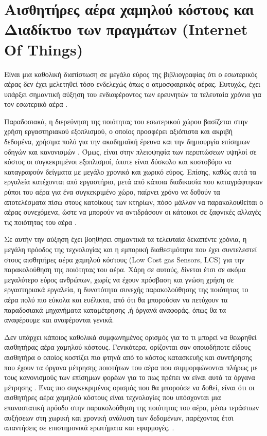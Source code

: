 \section{Αισθητήρες αέρα χαμηλού κόστους και Διαδίκτυο των πραγμάτων (Internet Of Things)}


Είναι μια καθολική διαπίστωση σε μεγάλο εύρος της βιβλιογραφίας ότι ο εσωτερικός αέρας δεν έχει μελετηθεί τόσο ενδελεχώς όπως ο ατμοσφαιρικός αέρας. 
Ευτυχώς, έχει υπάρξει σημαντική αύξηση του ενδιαφέροντος των ερευνητών τα τελευταία χρόνια για τον εσωτερικό αέρα \cite{SA2022102551}.


Παραδοσιακά, η διερεύνηση της ποιότητας του εσωτερικού χώρου βασίζεται στην χρήση εργαστηριακού εξοπλισμού,
ο οποίος προσφέρει αξιόπιστα και ακριβή δεδομένα, χρήσιμα πολύ για την ακαδημαϊκή έρευνα και την δημιουργία επίσημων οδηγών και κανονισμών \cite{EUROPEANSTANDARDS2014}. 
Όμως, είναι στην πλειοψηφία των περιπτώσεων υψηλοί σε κόστος οι συγκεκριμένοι εξοπλισμοί, όποτε είναι δύσκολο και κοστοβόρο να καταγραφούν δείγματα με μεγάλο χρονικό και χωρικό εύρος.
Επίσης, καθώς αυτά τα εργαλεία κατέχονται από εργαστήριο, μετά από κάποια διαδικασία που καταγράφτηκαν ρύποι του αέρα για ένα συγκεκριμένο χώρο, 
παίρνει χρόνο να δοθούν τα αποτελέσματα πίσω στους κατοίκους των κτηρίων,
πόσο μάλλον να παρακολουθείται ο αέρας συνεχόμενα, ώστε να μπορούν να αντιδράσουν οι κάτοικοι σε ξαφνικές αλλαγές τις ποιότητας του αέρα \cite{DAI2023164858}.

Σε αυτήν την αύξηση έχει βοηθήσει σημαντικά τα τελευταία δεκαπέντε χρόνια, η μεγάλη πρόοδος της τεχνολογίας και η εμπορική διαθεσιμότητα  που έχει συντελεστεί στους αισθητήρες αέρα χαμηλού κόστους (Low Cost gas Sensors, LCS) για την παρακολούθηση της ποιότητας του αέρα.
Χάρη σε αυτούς, δίνεται έτσι σε ακόμα μεγαλύτερο εύρος ανθρώπων, χωρίς να έχουν πρόσβαση και γνώση χρήση σε εργαστηριακά εργαλεία,
η δυνατότητα συνεχής παρακολούθησης της ποιότητας το αέρα πολύ πιο εύκολα και ευέλικτα, από ότι θα μπορούσαν να πετύχουν τα παραδοσιακά μηχανήματα καταμέτρησης \cite{CHOJER2020138385},ή όργανά αναφοράς, όπως θα τα αναφέρουμε και αναφέρονται γενικά.




Δεν υπάρχει κάποιος καθολικά συμφωνημένος ορισμός για το τι μπορεί να θεωρηθεί αισθητήρας αέρα χαμηλού κόστους.
Γενικότερα, ορίζονται σαν οποιοδήποτε είδους αισθητήρα ο οποίος κοστίζει πιο φτηνά από το κόστος κατασκευής και συντήρησης 
που έχουν τα όργανα μέτρησης ποιοτήτων του αέρα που συμμορφώνονται πλήρως με τους κανονισμούς των επίσημων φορέων για το πως πρέπει να είναι αυτά τα όργανα μέτρησης \cite{CHOJER2020138385}.
Ένας πιο συγκεκριμένος ορισμός που θα μπορούσε να δοθεί, είναι ότι οι αισθητήρες αέρα χαμηλού κόστους είναι τεχνολογίες που υπόσχονται μια επαναστατική πρόοδο στην παρακολούθηση της ποιότητας του αέρα,
μέσω τεράστιων αυξήσεων στη χωρική και χρονική ανάλυση των δεδομένων, παρέχοντας έτσι απαντήσεις σε επιστημονικά ερωτήματα και εφαρμογές. \cite{MORAWSKA2018286}.



